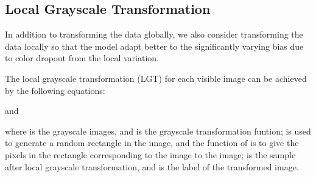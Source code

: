\documentclass[10pt,twocolumn,letterpaper]{article}
\begin{document}
\subsection{Local Grayscale Transformation}
In addition to transforming the data globally, we also consider transforming the data locally so that the model adapt better to the significantly varying bias due to color dropout from the local variation.



The local grayscale transformation (LGT) for each visible image  can be achieved by the following equations:






and

where  is the grayscale images, and  is the grayscale transformation funtion;  is used to generate a random rectangle in the image, and the function of  is to give the pixels in the rectangle corresponding to the  image to the  image;  is the sample after local grayscale transformation, and  is the label of the transformed image.
\end{document}
